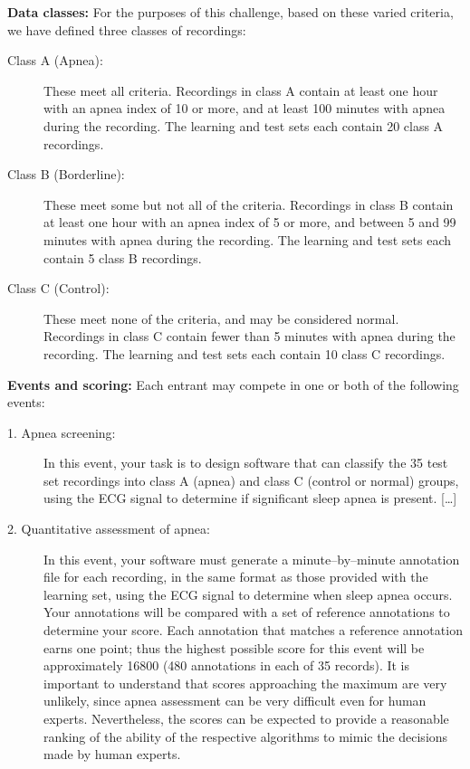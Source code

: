\documentclass[]{article}
\begin{document}
{  {\rm \textbf{Data classes:}}
  For the purposes of this challenge, based on these varied criteria,
  we have defined three classes of recordings:
  \begin{description}
  \item[Class A (Apnea):] These meet all criteria. Recordings in class
    A contain at least one hour with an apnea index of 10 or more, and
    at least 100 minutes with apnea during the recording. The learning
    and test sets each contain 20 class A recordings.
  \item[Class B (Borderline):] These meet some but not all of the
    criteria. Recordings in class B contain at least one hour with an
    apnea index of 5 or more, and between 5 and 99 minutes with apnea
    during the recording. The learning and test sets each contain 5
    class B recordings.
  \item[Class C (Control):] These meet none of the criteria, and may
    be considered normal. Recordings in class C contain fewer than 5
    minutes with apnea during the recording. The learning and test
    sets each contain 10 class C recordings.
  \end{description}

  {\rm \textbf{Events and scoring:}}
  Each entrant may compete in one or both of the following events:
  \begin{description}
  \item[1. Apnea screening:] In this event, your task is to design
    software that can classify the 35 test set recordings into class A
    (apnea) and class C (control or normal) groups, using the ECG
    signal to determine if significant sleep apnea is present.  [\ldots]
  \item[2. Quantitative assessment of apnea:] In this event, your
    software must generate a minute--by--minute annotation file for
    each recording, in the same format as those provided with the
    learning set, using the ECG signal to determine when sleep apnea
    occurs.  Your annotations will be compared with a set of reference
    annotations to determine your score. Each annotation that matches
    a reference annotation earns one point; thus the highest possible
    score for this event will be approximately 16800 (480 annotations
    in each of 35 records). It is important to understand that scores
    approaching the maximum are very unlikely, since apnea assessment
    can be very difficult even for human experts. Nevertheless, the
    scores can be expected to provide a reasonable ranking of the
    ability of the respective algorithms to mimic the decisions made
    by human experts.
  \end{description}
}%
\end{document}
